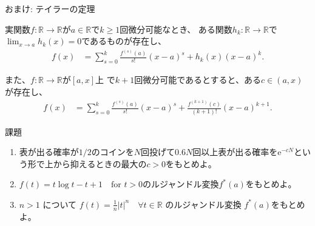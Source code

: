 \documentclass[lualatex,handout]{beamer}
\theoremstyle{definition}
\begin{document}
\begin{frame}{おまけ: テイラーの定理}
\begin{theorem}[テイラーの定理]
実関数$f\colon\mathbb{R}\to\mathbb{R}$が$a\in\mathbb{R}$で$k\ge 1$回微分可能なとき、
ある関数$h_k\colon\mathbb{R}\to\mathbb{R}$で$\lim_{x\to a}h_k(x)=0$であるものが存在し、
\begin{align*}
f(x) &= \sum_{s=0}^k \frac{f^{(s)}(a)}{s!}(x-a)^s + h_k(x)(x-a)^k.
\end{align*}

また、$f\colon\mathbb{R}\to\mathbb{R}$が$[a, x]$上 で$k+1$回微分可能であるとすると、ある$c\in(a, x)$が存在し、
\begin{align*}
f(x) &= \sum_{s=0}^k \frac{f^{(s)}(a)}{s!}(x-a)^s + \frac{f^{(k+1)}(c)}{(k+1)!}(x-a)^{k+1}.
\end{align*}
\end{theorem}
\end{frame}

\begin{frame}{課題}
\begin{enumerate}
\setlength{\itemsep}{2em}
\item 表が出る確率が$1/2$のコインを$N$回投げて$0.6N$回以上表が出る確率を$\mathrm{e}^{-cN}$という形で上から抑えるときの最大の$c>0$をもとめよ。
\item $f(t) = t \log t - t + 1\quad\text{for } t > 0$のルジャンドル変換$f^*(a)$をもとめよ。
\item $n> 1$ について $f(t) = \frac1n |t|^n \quad\forall t\in\mathbb{R}$ のルジャンドル変換 $f^*(a)$をもとめよ。
\end{enumerate}
\end{frame}

\end{document}
